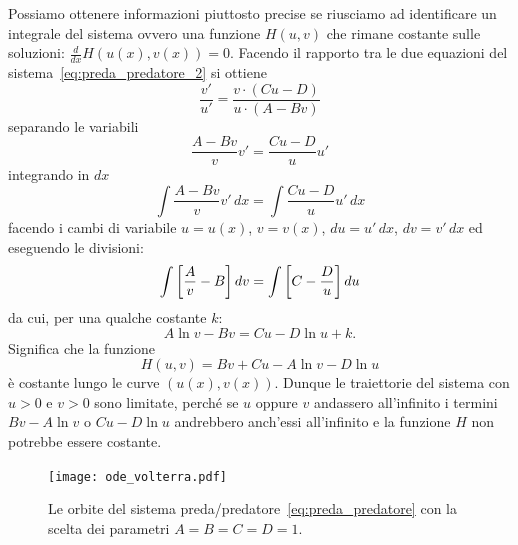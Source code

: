 Possiamo ottenere informazioni piuttosto precise 
se riusciamo ad identificare un integrale 
del sistema ovvero una funzione $H(u,v)$ che rimane costante sulle soluzioni: 
$\frac {d}{dx} H(u(x),v(x)) = 0$. 
Facendo il rapporto tra le due equazioni del sistema~\eqref{eq:preda_predatore_2}
si ottiene 
\[
  \frac{v'}{u'} 
  = \frac{v \cdot (C u - D)}{u \cdot (A - B v)}
\]
separando le variabili
\[
  \frac{A - B v}{v} v' = \frac{C u - D}{u} u'
\]
integrando in $dx$
\[
  \int \frac{A - B v}{v} v'\, dx  = \int \frac{C u - D}{u} u'  \, dx
\]
facendo i cambi di variabile $u=u(x)$, $v=v(x)$, $du = u'\, dx$, $dv=v'\, dx$
ed eseguendo le divisioni:
\[     
  \int {\left[ \frac A v - B \right]}\, dv = \int {\left[ C  - \frac D u \right]}\, du
\]
da cui, per una qualche costante $k$:
\[
  A \ln v - B v = C u - D\ln u + k.
\]
Significa che la funzione 
\[
  H(u,v) = B v + C u - A \ln v - D \ln u
\]
è costante lungo le curve $(u(x),v(x))$.
Dunque le traiettorie del sistema 
con $u>0$ e $v>0$ sono limitate, perché se 
$u$ oppure $v$ andassero all'infinito 
i termini $Bv-A\ln v$ o $Cu - D \ln u$ andrebbero 
anch'essi all'infinito e la funzione $H$ non 
potrebbe essere costante.

\newsavebox{\qrEdoVolterra}
\begin{figure}
  \begin{center}
    \texttt{[image: ode\_volterra.pdf]}
  \end{center}
  \caption{
  Le orbite del sistema preda/predatore~\eqref{eq:preda_predatore} 
  con la scelta dei parametri $A=B=C=D=1$.
  \ifwidemargin\\\\\fi%
  \usebox{\qrEdoVolterra}}
  \label{fig:ode_volterra}
\end{figure}

